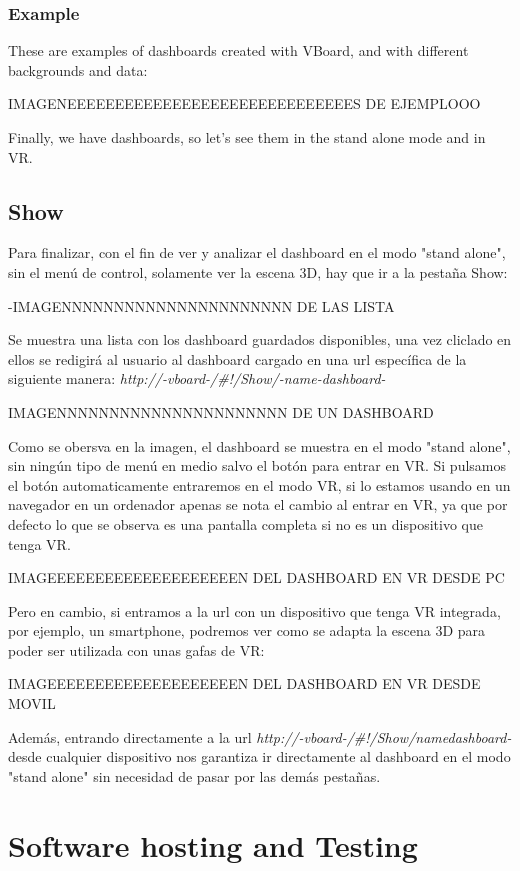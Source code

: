 \documentclass[a4paper, 12pt]{book}
\begin{document}
\subsubsection{Example}

These are examples of dashboards created with VBoard, and with different backgrounds and data:

IMAGENEEEEEEEEEEEEEEEEEEEEEEEEEEEEEES DE EJEMPLOOO

Finally, we have dashboards, so let's see them in the stand alone mode and in VR.

\subsection{Show}

Para finalizar, con el fin de ver y analizar el dashboard en el modo "stand alone", sin el menú de control, solamente ver la escena 3D, hay que ir a la pestaña Show:

-IMAGENNNNNNNNNNNNNNNNNNNNNN DE LAS LISTA

Se muestra una lista con los dashboard guardados disponibles, una vez cliclado en ellos se redigirá al usuario al dashboard cargado en una url específica de la siguiente manera: \textit{http://-vboard-/\#!/Show/-name-dashboard-}

IMAGENNNNNNNNNNNNNNNNNNNNNN DE UN DASHBOARD

Como se obersva en la imagen, el dashboard se muestra en el modo "stand alone", sin ningún tipo de menú en medio salvo el botón para entrar en VR. Si pulsamos el botón automaticamente entraremos en el modo VR, si lo estamos usando en un navegador en un ordenador apenas se nota el cambio al entrar en VR, ya que por defecto lo que se observa es una pantalla completa si no es un dispositivo que tenga VR.


IMAGEEEEEEEEEEEEEEEEEEEEN DEL DASHBOARD EN VR DESDE PC

Pero en cambio, si entramos a la url con un dispositivo que tenga VR integrada, por ejemplo, un smartphone, podremos ver como se adapta la escena 3D para poder ser utilizada con unas gafas de VR:

IMAGEEEEEEEEEEEEEEEEEEEEN DEL DASHBOARD EN VR DESDE MOVIL

Además, entrando directamente a la url \textit{http://-vboard-/\#!/Show/\-namedashboard-} desde cualquier dispositivo nos garantiza ir directamente al dashboard en el modo "stand alone" sin necesidad de pasar por las demás pestañas.


\section{Software hosting and Testing}
\label{sec:softhostest}
\end{document}
